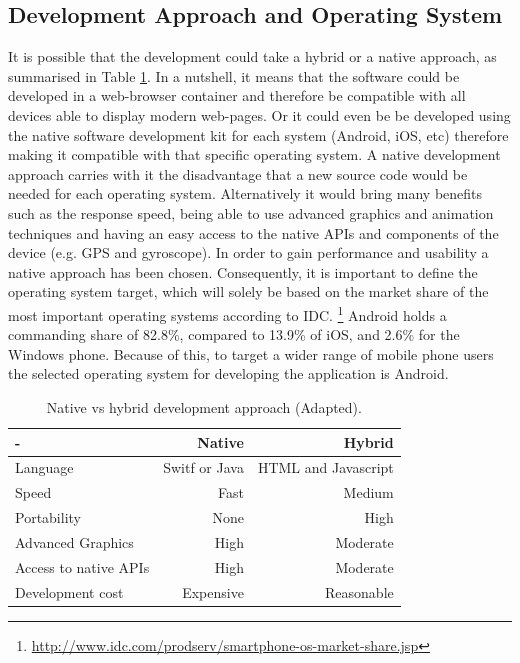 \subsection{Development Approach and Operating System}
It is possible that the development could take a hybrid or a native approach, as summarised in Table \ref{tab:development_approaches}. In a nutshell, it means that the software could be developed in a web-browser container and therefore be compatible with all devices able to display modern web-pages. Or it could even be be developed using the native software development kit for each system (Android, iOS, etc) therefore making it compatible with that specific operating system. A native development approach carries with it the disadvantage that a new source code would be needed for each operating system. Alternatively it would bring many benefits such as the response speed, being able to use advanced graphics and animation techniques and having an easy access to the native APIs and components of the device (e.g. GPS and gyroscope). In order to gain performance and usability a native approach has been chosen. Consequently, it is important to define the operating system target, which will solely be based on the market share of the most important operating systems according to IDC. \footnote{\url{http://www.idc.com/prodserv/smartphone-os-market-share.jsp}} Android holds a commanding share of 82.8\%, compared to 13.9\% of iOS, and 2.6\% for the Windows phone. Because of this, to target a wider range of mobile phone users the selected operating system for developing the application is Android.

\begin{table}[ht]
\centering
\begin{adjustbox}{width=.6\textwidth,center=\textwidth}
\begin{tabular}{lrr}
  \hline
   - & Native & Hybrid  \\ \hline
   Language & Switf or Java & HTML and Javascript \\
   Speed & Fast & Medium \\
   Portability & None & High \\
   Advanced Graphics & High & Moderate \\
   Access to native APIs & High & Moderate \\
   Development cost & Expensive & Reasonable \\
   \hline
\end{tabular}
\end{adjustbox}
  \caption[Native vs hybrid development approach ]{Native vs hybrid development approach (Adapted). \footnotemark }
\label{tab:development_approaches}
\end{table} 

